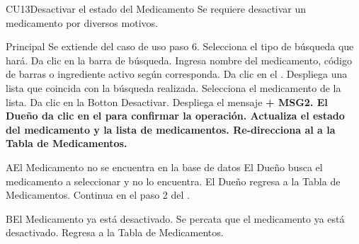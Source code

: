 \begin{UseCase}{CU13}{Desactivar el estado del Medicamento}{
		Se requiere desactivar un medicamento por diversos motivos.
	}
	\end{UseCase}
\begin{UCtrayectoria}{Principal}
		\UCpaso Se extiende del caso de uso  paso 6.
		\UCpaso[\UCactor] Selecciona el tipo de búsqueda que hará.
		\UCpaso[\UCactor] Da clic en la barra de búsqueda.
		\UCpaso [\UCactor] Ingresa nombre del medicamento, código de barras o ingrediente activo según corresponda. 
		\UCpaso[\UCactor] Da clic en el .
		\UCpaso Despliega una lista que coincida con la búsqueda realizada. 
		\UCpaso[\UCactor] Selecciona el medicamento de la lista.
		\UCpaso[\UCactor] Da clic en la  {Botton Desactivar}.
		\UCpaso Despliega el mensaje \bf {+ MSG2}.
		\UCpaso[\UCactor] El Dueño da clic en el  para confirmar la operación.
		\UCpaso Actualiza el estado del medicamento y la lista de medicamentos.
		\UCpaso Re-direcciona al \UCactor a la  {Tabla de Medicamentos}.
	
	\end{UCtrayectoria}


		\begin{UCtrayectoriaA}{A}{El Medicamento no se encuentra en la base de datos}
			\UCpaso[\UCactor] El Dueño busca el medicamento a seleccionar y no lo encuentra.
			\UCpaso[\UCactor] El Dueño regresa a la  {Tabla de Medicamentos}.
			\UCpaso Continua en el paso 2 del .
		\end{UCtrayectoriaA}
		
		
		\begin{UCtrayectoriaA}{B}{El Medicamento ya está desactivado}.
			\UCpaso[\UCactor] Se percata que el medicamento ya está desactivado.
			\UCpaso[\UCactor] Regresa a la  {Tabla de Medicamentos}.
		\end{UCtrayectoriaA}


